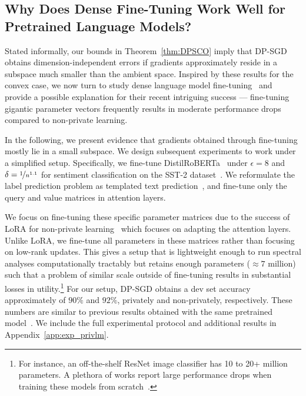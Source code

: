 \subsection{Why Does Dense Fine-Tuning Work Well for Pretrained Language Models?}\label{sec:lm}
Stated informally, our bounds in Theorem~\ref{thm:DPSCO} imply that DP-SGD obtains dimension-independent errors if gradients approximately reside in a subspace much smaller than the ambient space.
Inspired by these results for the convex case, we now turn to study dense language model fine-tuning~\cite{li2021large} and provide a possible explanation for their recent intriguing success --- fine-tuning gigantic parameter vectors frequently results in moderate performance drops compared to non-private learning.


In the following, we present evidence that gradients obtained through fine-tuning mostly lie in a small subspace.
We design subsequent experiments to work under a simplified setup. 
Specifically, we fine-tune DistilRoBERTa~\cite{sanh2019distilbert,liu2019roberta} under $\epsilon=8$ and $\delta = \nicefrac{1}{n^{1.1}}$ for sentiment classification on the SST-2 dataset~\cite{socher2013recursive}.
We reformulate the label prediction problem as templated text prediction~\cite{li2021large}, and fine-tune only the query and value matrices in attention layers.

We focus on fine-tuning these specific parameter matrices due to the success of LoRA for non-private learning~\cite{hu2021lora} which focuses on adapting the attention layers. Unlike LoRA, we fine-tune all parameters in these matrices rather than focusing on low-rank updates.
This gives a setup that is lightweight enough to run spectral analyses computationally tractably but retains enough parameters ($\approx7$ million) such that a problem of similar scale outside of fine-tuning results in substantial losses in utility.\footnote{For instance, an off-the-shelf ResNet image classifier has 10 to 20+ million parameters. A plethora of works report large performance drops when training these models from scratch~\cite{YZCL21,luo2021scalable,de2022unlocking}.}
For our setup, DP-SGD obtains a dev set accuracy approximately of $90\%$ and $92\%$, privately and non-privately, respectively.
These numbers are similar to previous results obtained with the same pretrained model~\cite{yu2021differentially,li2021large}. We include the full experimental protocol and additional results in Appendix~\ref{app:exp_privlm}. 


